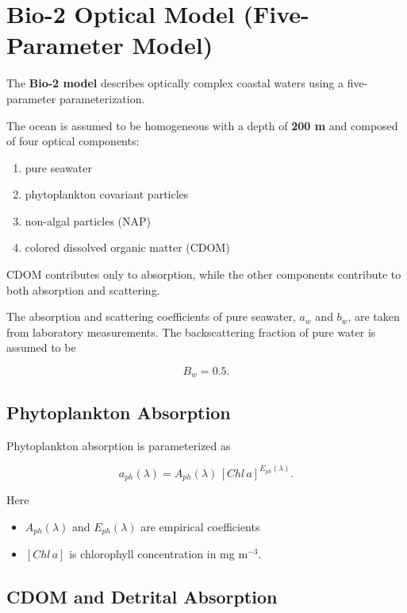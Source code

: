 \documentclass[
  letterpaper,
]{scrbook}
\providecommand{\tightlist}{%
  \setlength{\itemsep}{0pt}\setlength{\parskip}{0pt}}
\begin{document}
\section{Bio-2 Optical Model (Five-Parameter
Model)}\label{bio-2-optical-model-five-parameter-model}

The \textbf{Bio-2 model} describes optically complex coastal waters
using a five-parameter parameterization.

The ocean is assumed to be homogeneous with a depth of \textbf{200 m}
and composed of four optical components:

\begin{enumerate}
\def\labelenumi{\arabic{enumi}.}
\tightlist
\item
  pure seawater
\item
  phytoplankton covariant particles
\item
  non-algal particles (NAP)
\item
  colored dissolved organic matter (CDOM)
\end{enumerate}

CDOM contributes only to absorption, while the other components
contribute to both absorption and scattering.

The absorption and scattering coefficients of pure seawater, \(a_w\) and
\(b_w\), are taken from laboratory measurements. The backscattering
fraction of pure water is assumed to be

\[
B_w = 0.5.
\]

\subsection{Phytoplankton Absorption}\label{phytoplankton-absorption-1}

Phytoplankton absorption is parameterized as

\[
a_{ph}(\lambda) = A_{ph}(\lambda)\,[Chl\,a]^{E_{ph}(\lambda)}.
\]

Here

\begin{itemize}
\tightlist
\item
  \(A_{ph}(\lambda)\) and \(E_{ph}(\lambda)\) are empirical coefficients
\item
  \([Chl\,a]\) is chlorophyll concentration in mg m\(^{-3}\).
\end{itemize}

\subsection{CDOM and Detrital
Absorption}\label{cdom-and-detrital-absorption}
\end{document}
